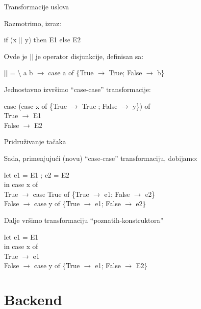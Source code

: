 \documentclass{beamer}
\begin{document}
\begin{frame}[fragile]{Transformacije uslova}

	Razmotrimo, izraz:
	\begin{block}{}
	if (x $ || $ y) then E1 else E2
	\end{block}

	Ovde je $ || $ je operator disjunkcije, definisan sa:
	\begin{block}{}
	$ || $ = $ \setminus $ a b $ \rightarrow $ case a of \{True $ \rightarrow $ True; False $ \rightarrow $ b\}
	\end{block}

	Jednostavno izvršimo “case-case” transformacije:
	\begin{block}{}
		case (case x of \{True $ \rightarrow $ True ; False $ \rightarrow $ y\}) of\\
		True $ \rightarrow $ E1\\
		False $ \rightarrow $ E2
	\end{block}
\end{frame}

\begin{frame}[fragile]{Pridruživanje tačaka}
		
		Sada, primenjujući (novu) “case-case” transformaciju, dobijamo:
		\begin{block}{}
			let e1 = E1 ; e2 = E2 \\
			in case x of \\
			True $ \rightarrow $ case True of \{True $ \rightarrow $ e1; False $ \rightarrow $ e2\} \\
			False $ \rightarrow $ case y of \{True $ \rightarrow $ e1; False $ \rightarrow $ e2\}
		\end{block}
		
		Dalje vršimo transformaciju “poznatih-konstruktora”
		\begin{block}{}
			let e1 = E1 \\
			in case x of \\
			True $ \rightarrow $ e1 \\
			False $ \rightarrow $ case y of \{True $ \rightarrow $ e1; False $ \rightarrow $ E2\}
		\end{block}
\end{frame}

\section{Backend}
\end{document}
